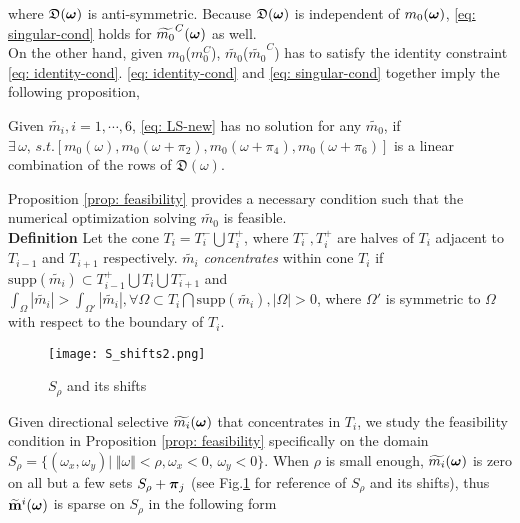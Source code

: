where $\mathfrak{D}(\boldsymbol{\omega})$ is anti-symmetric. Because $\mathfrak{D}(\boldsymbol{\omega})$ is independent of $m_0(\boldsymbol{\omega})$, \eqref{eq: singular-cond} holds for $\widetilde{m_{0}}^C(\boldsymbol{\omega})$ as well.\\

On the other hand, given $m_0$($m_0^C$), $\widetilde{m_0}$($\widetilde{m_0}^C$) has to satisfy the identity constraint \eqref{eq: identity-cond}.
\eqref{eq: identity-cond} and \eqref{eq: singular-cond} together imply the following proposition,
\begin{proposition}\label{prop: feasibility}
Given $\widetilde{m_i}, i = 1,\cdots,6$, \eqref{eq: LS-new} has no solution for any $\widetilde{m_0}$, if $\exists\,\omega, \,s.t. [m_0(\omega), m_0(\omega+\pi_2),m_0(\omega+\pi_4),m_0(\omega+\pi_6)]$ is a linear combination of the rows of $\mathfrak{D}(\omega)$.%
\end{proposition}
Proposition \ref{prop: feasibility} provides a necessary condition such that the numerical optimization solving $\widetilde{m_0}$ is feasible.
\\[.5em]
{\bf Definition} Let the cone $T_i = T_i^-\bigcup T_i^+$, where $T_i^-, T_i^+$ are halves of $T_i$ adjacent  to $T_{i-1}$ and $T_{i+1}$ respectively.  $\widetilde{m_i}$ {\it concentrates} within cone $T_i$ if $\text{supp}(\widetilde{m_i})\subset T_{i-1}^+\bigcup T_i\bigcup T_{i+1}^-$ and $\int_\Omega|\widetilde{m_i}| > \int_{\Omega'}|\widetilde{m_i}|, \forall \Omega\subset T_i\bigcap\text{supp}(\widetilde{m_i}), |\Omega|>0$, where $\Omega'$ is symmetric to $\Omega$ with respect to the boundary of $T_i$.\\[.5em]
\begin{figure}
\centering
\texttt{[image: S\_shifts2.png]}
\caption{$S_{\rho}$ and its shifts}
\label{fig: S-shifts}
\end{figure}
Given directional selective $\widetilde{m_{i}}(\boldsymbol{\omega})$ that concentrates in $T_i$, we study the feasibility condition in Proposition \ref{prop: feasibility} specifically on the domain $S_{\rho} = \{(\omega_x,\omega_y)|\;\Vert\omega\Vert < \rho, \omega_x <0,\,\omega_y<0\}$. When $\rho$ is small enough, $\widetilde{m_{i}}(\boldsymbol{\omega})$ is zero on all but a few sets $S_\rho + \boldsymbol{\pi}_j$ (see Fig.\ref{fig: S-shifts} for reference of $S_\rho$ and its shifts), thus $\widetilde{\mathbf{m}}^{i}(\boldsymbol{\omega})$ is sparse on $S_\rho$ in the following form
